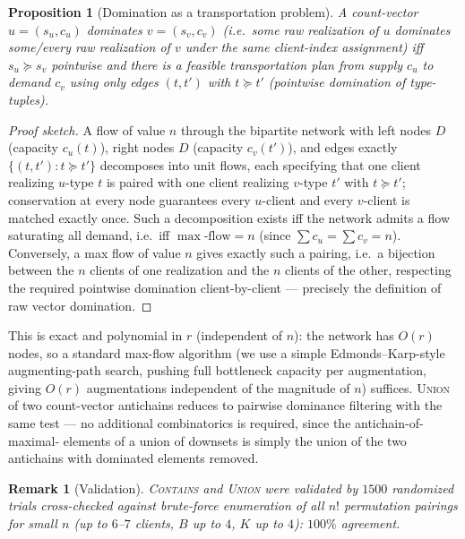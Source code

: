\documentclass[11pt]{article}
\newtheorem{proposition}{Proposition}
\newtheorem{remark}{Remark}
\newcommand{\dom}{\succeq}
\begin{document}
\begin{proposition}[Domination as a transportation problem]
\label{prop:contains}
A count-vector $u=(s_u,c_u)$ dominates $v=(s_v,c_v)$ (i.e.\ some raw
realization of $u$ dominates some/every raw realization of $v$ under the
same client-index assignment) iff $s_u \dom s_v$ pointwise \emph{and} there
is a feasible transportation plan from supply $c_u$ to demand $c_v$ using
only edges $(t,t')$ with $t \dom t'$ (pointwise domination of type-tuples).
\end{proposition}

\begin{proof}[Proof sketch]
A flow of value $n$ through the bipartite network with left nodes $D$
(capacity $c_u(t)$), right nodes $D$ (capacity $c_v(t')$), and edges
exactly $\{(t,t') : t \dom t'\}$ decomposes into unit flows, each
specifying that one client realizing $u$-type $t$ is paired with one
client realizing $v$-type $t'$ with $t \dom t'$; conservation at every node
guarantees every $u$-client and every $v$-client is matched exactly once.
Such a decomposition exists iff the network admits a flow saturating all
demand, i.e.\ iff $\max\text{-flow} = n$ (since $\sum c_u = \sum c_v = n$).
Conversely, a max flow of value $n$ gives exactly such a pairing, i.e.\ a
bijection between the $n$ clients of one realization and the $n$ clients of
the other, respecting the required pointwise domination client-by-client
--- precisely the definition of raw vector domination.
\end{proof}

This is exact and polynomial in $r$ (independent of $n$): the network has
$O(r)$ nodes, so a standard max-flow algorithm (we use a simple
Edmonds--Karp-style augmenting-path search, pushing full bottleneck
capacity per augmentation, giving $O(r)$ augmentations independent of the
magnitude of $n$) suffices. \textsc{Union} of two count-vector antichains
reduces to pairwise dominance filtering with the same test --- no
additional combinatorics is required, since the antichain-of-maximal-
elements of a union of downsets is simply the union of the two antichains
with dominated elements removed.

\begin{remark}[Validation]
\textsc{Contains} and \textsc{Union} were validated by $1500$ randomized
trials cross-checked against brute-force enumeration of all $n!$
permutation pairings for small $n$ (up to $6$--$7$ clients, $B$ up to $4$,
$K$ up to $4$): $100\%$ agreement.
\end{remark}
\end{document}
